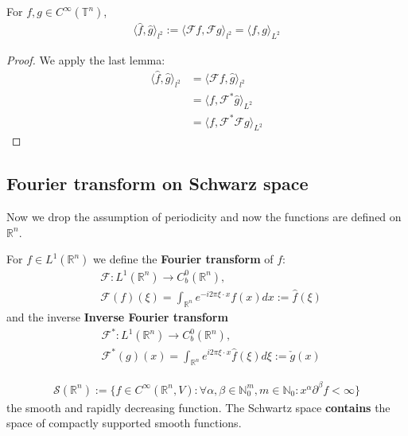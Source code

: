 \begin{theorem}
	For $f, g \in C^\infty(\mathbb{T}^n)$, 
	\begin{align*}
		\langle \hat{f}, \hat{g} \rangle_{l^2} := \langle \mathcal{F} f, \mathcal{F} g \rangle_{l^2} = \langle  f, g \rangle_{L^2}
	\end{align*}
\end{theorem}
\begin{proof}
	We apply the last lemma:
	\begin{align*}
		\langle \hat{f}, \hat{g} \rangle_{l^2} &= \langle \mathcal{F} f, \hat{g} \rangle_{l^2}\\
		&= \langle f, \mathcal{F}^* \hat{g} \rangle_{L^2}\\
		&= \langle f, \mathcal{F}^* \mathcal{F} g \rangle_{L^2}
	\end{align*}
\end{proof}


\subsection{Fourier transform on Schwarz space}
Now we drop the assumption of periodicity and now the functions are defined on $\mathbb{R}^n$. 
\begin{definition}
	For $f \in L^1(\mathbb{R}^n)$ we define the \textbf{Fourier transform} of $f$:
	\begin{align*}
		&\mathcal{F}: L^1(\mathbb{R}^n) \rightarrow C^0_b(\mathbb{R}^n),\\
		&\mathcal{F}(f)(\xi) = \int_{\mathbb{R}^n} e^{-i 2 \pi \xi \cdot  x} f(x) dx:= \hat{f}(\xi)
	\end{align*}
	and the inverse \textbf{Inverse Fourier transform}
	\begin{align*}
		&\mathcal{F}^*: L^1(\mathbb{R}^n) \rightarrow C^0_b(\mathbb{R}^n), \\
		&\mathcal{F}^*(g)(x) = \int_{\mathbb{R}^n} e^{i 2 \pi\xi \cdot x} \hat{f}(\xi) d\xi := \check{g}(x)
	\end{align*}
\end{definition}

\begin{definition}
\begin{align*}
	\mathcal{S}(\mathbb{R}^n):= \{ f \in C^\infty(\mathbb{R}^n, V): \forall \alpha , \beta \in \mathbb{N}^m_0, m \in \mathbb{N}_0: x^\alpha \partial^\beta f < \infty\}
\end{align*}
the smooth and rapidly decreasing function. The Schwartz space \textbf{contains} the space of compactly supported smooth functions. 
\end{definition}

